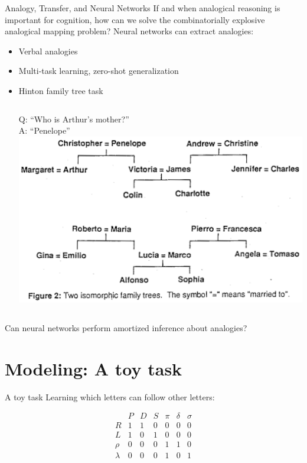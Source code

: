 \documentclass{beamer}
\begin{document}
\begin{frame}{Analogy, Transfer, and Neural Networks}
If and when analogical reasoning is important for cognition, how can we solve the combinatorially explosive analogical mapping problem? Neural networks can extract analogies: 
\begin{itemize}
    \item<2-> Verbal analogies \cite{Kollias2013}
    \item<3-> Multi-task learning, zero-shot generalization \cite{Luong2016,Johnson2016}  
    \item<4-> Hinton family tree task \cite{Hinton1986}
    \begin{columns}
     Q: ``Who is Arthur's mother?'' \\ A: ``Penelope'' 
	\includegraphics[width = \textwidth]{../writing/cogsci_2017/figures/hinton_family_tree_figure.png}
    \end{columns}
\end{itemize}
 {Can neural networks perform amortized inference about analogies?}
\end{frame}

\section{Modeling: A toy task}
\begin{frame}{A toy task}
Learning which letters can follow other letters:\vspace{-2em}
\begin{center}
\[
\begin{array}{c|cccccc} 
& P & D & S & \pi & \delta & \sigma \\
\hline
R & 1 & 1 & 0 & 0 & 0 & 0 \\
L & 1 & 0 & 1 & 0 & 0 & 0 \\
\rho & 0 & 0 & 0 & 1 & 1 & 0\\
\lambda & 0 & 0 & 0 & 1 & 0 & 1\\
\end{array} 
\]
\end{center}
\end{frame}
\end{document}
